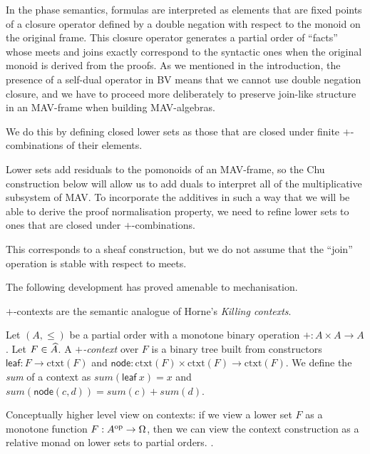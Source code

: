 In the phase semantics, formulas are interpreted as elements that are
fixed points of a closure operator defined by a double negation with
respect to the monoid on the original frame. This closure operator
generates a partial order of ``facts'' whose meets and joins exactly
correspond to the syntactic ones when the original monoid is derived
from the proofs. As we mentioned in the introduction, the presence of
a self-dual operator in BV means that we cannot use double negation
closure, and we have to proceed more deliberately to preserve
join-like structure in an MAV-frame when building MAV-algebras.

We do this by defining closed lower sets as those that are closed
under finite $+$-combinations of their elements. 

Lower sets add residuals to the pomonoids of an MAV-frame, so the Chu
construction below will allow us to add duals to interpret all of the
multiplicative subsystem of MAV. To incorporate the additives in such
a way that we will be able to derive the proof normalisation property,
we need to refine lower sets to ones that are closed under
$+$-combinations.

This corresponds to a sheaf construction, but we do not assume that
the ``join'' operation is stable with respect to meets.


The following development has proved amenable to mechanisation.

$+$-contexts are the semantic analogue of Horne's \emph{Killing
  contexts}.

\begin{definition}
  Let $(A, \leq)$ be a partial order with a monotone binary operation
  $+ : A \times A \to A$.  Let $F \in \widehat{A}$. A
  \emph{$+$-context} over $F$ is a binary tree built from constructors
  $\mathsf{leaf} : F \to \mathrm{ctxt}(F)$ and
  $\mathsf{node} : \mathrm{ctxt}(F) \times \mathrm{ctxt}(F) \to
    \mathrm{ctxt}(F)$. We define the \emph{sum} of a context as
  $\mathit{sum}(\mathsf{leaf}~x) = x$ and
  $\mathit{sum}(\mathsf{node}(c,d)) = \mathit{sum}(c) +
    \mathit{sum}(d)$.
\end{definition}

\begin{remark}
  Conceptually higher level view on contexts: if we view a lower set
  $F$ as a monotone function $F : A^{\mathrm{op}} \to \Omega$, then we can view
  the context construction as a relative monad on lower sets to
  partial orders.  .
\end{remark}

